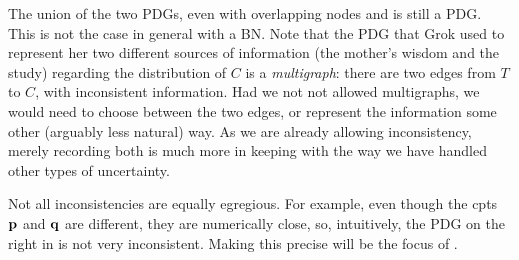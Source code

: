 \documentclass{article}
\newcommand{\MN}{PDG}
\numberwithin{equation}{section}
\begin{document}
\begin{example}
		The union of the two PDGs, even with overlapping nodes
                and is still a PDG. This is not the case 
                in general with a BN. Note that the PDG that Grok used
                to          represent her two 
                different sources of information (the mother's wisdom
                and the study) regarding the distribution of
               $C$ is a \emph{multigraph}: there are two 
                edges from $T$ to $C$, with inconsistent information.
                Had we not not allowed multigraphs, we would need to
                choose between the two edges, or represent the
                information some other (arguably less natural) way.
                As we are already allowing inconsistency,
                merely recording both is much more in keeping with the
                way we have handled other types of uncertainty. 
	\end{example}

Not all inconsistencies are equally egregious.
For example,
even though the cpts $\mathbf p$ and $\mathbf q$ are different, they
are numerically close, so, intuitively, the PDG on the right in
 is not very inconsistent.  
Making this precise will be the focus of	
.
\end{document}
